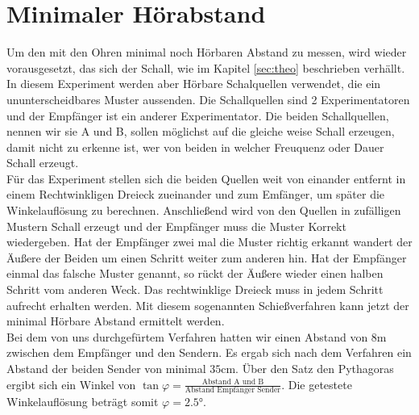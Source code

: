 \documentclass[12pt,a4paper,titlepage,headinclude]{scrartcl}
\numberwithin{equation}{subsection}
\begin{document}
\section{Minimaler Hörabstand}
Um den mit den Ohren minimal noch Hörbaren Abstand zu messen, wird wieder vorausgesetzt, das sich der Schall, wie im Kapitel \ref{sec:theo} beschrieben verhällt.
In diesem Experiment werden aber Hörbare Schalquellen verwendet, die ein ununterscheidbares Muster aussenden.
Die Schallquellen sind 2 Experimentatoren und der Empfänger ist ein anderer Experimentator.
Die beiden Schallquellen, nennen wir sie A und B, sollen möglichst auf die gleiche weise Schall erzeugen, damit nicht zu erkenne ist, wer von beiden in welcher Freuquenz oder Dauer Schall erzeugt.\\
Für das Experiment stellen sich die beiden Quellen weit von einander entfernt in einem Rechtwinkligen Dreieck zueinander und zum Emfänger, um später die Winkelauflösung zu berechnen.
Anschließend wird von den Quellen in zufälligen Mustern Schall erzeugt und der Empfänger muss die Muster Korrekt wiedergeben.
Hat der Empfänger zwei mal die Muster richtig erkannt wandert der Äußere der Beiden um einen Schritt weiter zum anderen hin.
Hat der Empfänger einmal das falsche Muster genannt, so rückt der Äußere wieder einen halben Schritt vom anderen Weck.
Das rechtwinklige Dreieck muss in jedem Schritt aufrecht erhalten werden.
Mit diesem sogenannten Schießverfahren kann jetzt der minimal Hörbare Abstand ermittelt werden.\\
Bei dem von uns durchgefürtem Verfahren hatten wir einen Abstand von $8\si{\meter}$ zwischen dem Empfänger und den Sendern.
Es ergab sich nach dem Verfahren ein Abstand der beiden Sender von minimal $35\si{\centi\meter}$.
Über den Satz den Pythagoras ergibt sich ein Winkel von $\tan{\varphi}=\frac{\text{Abstand A und B}}{\text{Abstand Empfänger Sender}}$.
Die getestete Winkelauflösung beträgt somit $\varphi=2.5\si{\degree}$.

\newpage
\printbibliography[heading=bibintoc]
\end{document}
